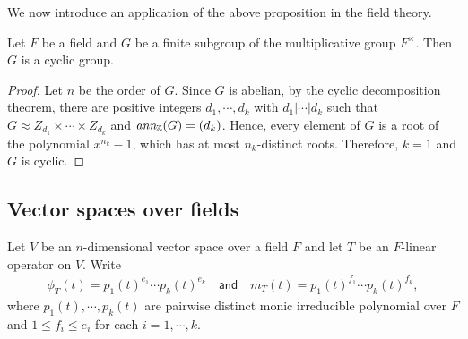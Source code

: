 We now introduce an application of the above proposition in the field theory.
\begin{prop}
    Let $F$ be a field and $G$ be a finite subgroup of the multiplicative group $F^\times$.
    Then $G$ is a cyclic group.
\end{prop}
\begin{proof}
    Let $n$ be the order of $G$.
    Since $G$ is abelian, by the cyclic decomposition theorem, there are positive integers $d_1, \cdots, d_k$ with $d_1|\cdots|d_k$ such that $G\approx Z_{d_1}\times\cdots\times Z_{d_k}$ and $\textit{ann}_{\mathbb{Z}}(G)=(d_k)$.
    Hence, every element of $G$ is a root of the polynomial $x^{n_k}-1$, which has at most $n_k$-distinct roots.
    Therefore, $k=1$ and $G$ is cyclic.
\end{proof}

\subsection{Vector spaces over fields}

Let $V$ be an $n$-dimensional vector space over a field $F$ and let $T$ be an $F$-linear operator on $V$.
Write
\begin{align*}
    \phi_T(t)=p_1(t)^{e_1}\cdots p_k(t)^{e_k}\quad\textsf{and}\quad m_T(t)=p_1(t)^{f_1}\cdots p_k(t)^{f_k},
\end{align*}
where $p_1(t), \cdots, p_k(t)$ are pairwise distinct monic irreducible polynomial over $F$ and $1\leq f_i\leq e_i$ for each $i=1, \cdots, k$.


